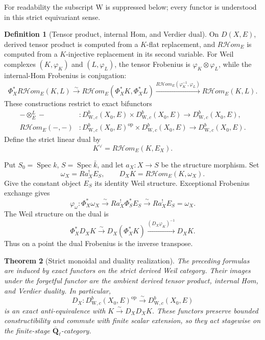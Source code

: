 \documentclass[10pt]{article}
\newtheorem{theorem}{Theorem}[section]
\theoremstyle{definition}
\newtheorem{definition}[theorem]{Definition}
\newcommand{\Qlb}{\overline{\mathbf Q}_\ell}
\newcommand{\WeilD}{D^b_{\mathrm W,c}}
\newcommand{\RHom}{R\mathcal Hom}
\begin{document}
For readability the subscript \({\mathrm W}\) is suppressed below; every
functor is understood in this strict equivariant sense.

\begin{definition}[Tensor product, internal Hom, and Verdier dual]
On \(D(X,E)\), derived tensor product is computed from a \(K\)-flat
replacement, and \(R\mathcal Hom_E\) is computed from a \(K\)-injective
replacement in its second variable.  For Weil complexes
\((K,\varphi_K)\) and \((L,\varphi_L)\), the tensor Frobenius is
\(\varphi_K\otimes\varphi_L\), while the internal-Hom Frobenius is
conjugation:
\[
 \Phi_X^*R\mathcal Hom_E(K,L)
 \xrightarrow{\sim}R\mathcal Hom_E(\Phi_X^*K,\Phi_X^*L)
 \xrightarrow{R\mathcal Hom_E(\varphi_K^{-1},\varphi_L)}
 R\mathcal Hom_E(K,L).
\]
These constructions restrict to exact bifunctors
\[
 \begin{aligned}
 -\otimes_E^L- &: \WeilD(X_0,E)\times\WeilD(X_0,E)
                    \longrightarrow\WeilD(X_0,E),\\
 \RHom_E(-,-) &: \WeilD(X_0,E)^{\mathrm{op}}\times\WeilD(X_0,E)
                    \longrightarrow\WeilD(X_0,E).
 \end{aligned}
\]
Define the strict linear dual by
\[
                         K^\vee=\RHom_E(K,E_X).
\]

Put \(S_0=\operatorname{Spec}k\), \(S=\operatorname{Spec}\bar k\), and
let \(a_X:X\to S\) be the structure morphism.  Set
\[
 \omega_X=Ra_X^!E_S,
 \qquad D_XK=R\mathcal Hom_E(K,\omega_X).
\]
Give the constant object \(E_S\) its identity Weil structure.  Exceptional
Frobenius exchange gives
\[
 \varphi_\omega:\Phi_X^*\omega_X
 \xrightarrow{\sim}Ra_X^!\Phi_S^*E_S
 \xrightarrow{\sim}Ra_X^!E_S=\omega_X.
\]
The Weil
structure on the dual is
\[
 \Phi_X^*D_XK\xrightarrow{\sim}D_X(\Phi_X^*K)
       \xrightarrow{(D_X\varphi_K)^{-1}}D_XK.
\]
Thus on a point the dual Frobenius is the inverse transpose.
\end{definition}

\begin{theorem}[Strict monoidal and duality realization]
The preceding formulas are induced by exact functors on the strict derived
Weil category.  Their images under the forgetful functor are the ambient
derived tensor product, internal Hom, and Verdier duality.  In particular,
\[
 D_X:\WeilD(X_0,E)^{\mathrm{op}}\xrightarrow{\sim}\WeilD(X_0,E)
\]
is an exact anti-equivalence with \(K\xrightarrow{\sim}D_XD_XK\).  These
functors preserve bounded constructibility and commute with finite scalar
extension, so they act stagewise on the finite-stage \(\Qlb\)-category.
\end{theorem}
\end{document}
